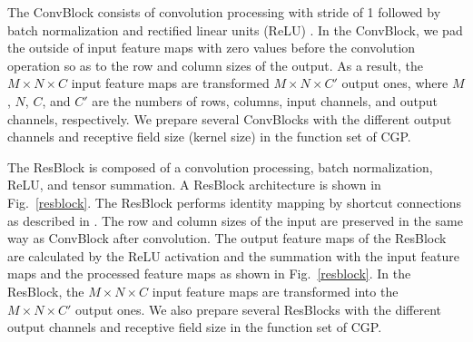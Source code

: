 The ConvBlock consists of  convolution processing with  stride of 1 followed by batch normalization \cite{ioffe_batch_2015} and rectified linear units (ReLU) \cite{nair_rectified_2010}. In the ConvBlock, we pad the outside of input feature maps with zero values before the convolution operation so as to  the row and column sizes of the output. 
As a result, the $M \times N \times C$ input feature maps are transformed  $M \times N \times C'$ output ones, where $M$, $N$, $C$, and $C'$ are the numbers of rows, columns, input channels, and output channels, respectively.
We prepare several ConvBlocks with the different output channels and  receptive field size (kernel size) in the function set of CGP.

The ResBlock is composed of a convolution processing, batch normalization, ReLU, and tensor summation. A ResBlock architecture is shown in Fig.~\ref{resblock}.
The ResBlock performs identity mapping by shortcut connections as described in \cite{he_deep_2016}.
The row and column sizes of the input are preserved in the same way as ConvBlock after convolution.
The output feature maps of the ResBlock are calculated by the ReLU activation and the summation with the input feature maps and the processed feature maps as shown in Fig.~\ref{resblock}.
In the ResBlock, the $M \times N \times C$ input feature maps are transformed into the $M\times N\times C'$ output ones.
We also prepare several ResBlocks with the different output channels and  receptive field size in the function set of CGP.

